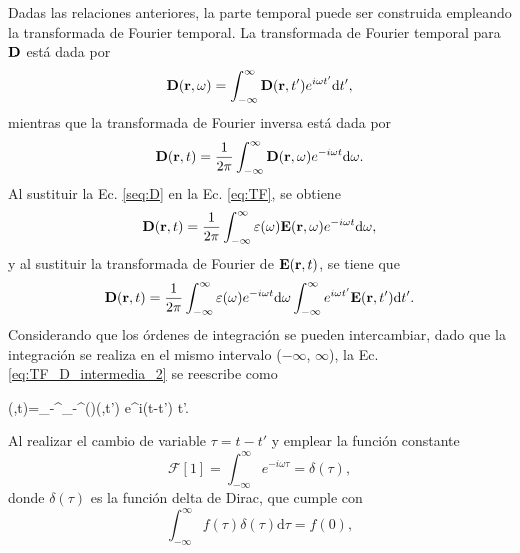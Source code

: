 Dadas las relaciones anteriores, la parte temporal puede ser construida empleando la transformada de Fourier temporal. La transformada de Fourier temporal para $\vb{D}$ está dada por~\cite{jacksonClassicalElectrodynamics2021a}
%
\begin{equation}
	\vb{D}(\vb{r},\omega)=\int_{-\infty}^{\infty}\vb{D}(\vb{r},t')e^{i\omega t'}\text{d}t',\label{eq:TFI}
\end{equation}
%
mientras que la transformada de Fourier inversa está dada por
%
\begin{equation}
	\vb{D}(\vb{r},t)=\frac{1}{2\pi}\int_{-\infty}^{\infty}\vb{D}(\vb{r},\omega)e^{-i\omega t}\text{d}\omega.\label{eq:TF}
\end{equation}
%
Al sustituir la Ec. \eqref{seq:D} en la Ec. \eqref{eq:TF}, se obtiene
%
\begin{equation}
	\vb{D}(\vb{r},t)=\frac{1}{2\pi}\int_{-\infty}^{\infty}\varepsilon(\omega)\vb{E}(\vb{r},\omega)e^{-i\omega t}\text{d}\omega,\label{eq:TF_D_intermedia_1}
\end{equation}
%
y al sustituir la transformada de Fourier de $\vb{E}(\vb{r},t)$, se tiene que
%
\begin{equation}
	\vb{D}(\vb{r},t)=\frac{1}{2\pi}\int_{-\infty}^{\infty}\varepsilon(\omega)e^{-i\omega t}\text{d}\omega\int_{-\infty}^{\infty}e^{i\omega t'}\vb{E}(\vb{r},t')\text{d}t'.\label{eq:TF_D_intermedia_2}
\end{equation}
%
Considerando que los órdenes de integración se pueden intercambiar, dado que la integración se realiza en el mismo intervalo ($-\infty$, $\infty$), la Ec. \eqref{eq:TF_D_intermedia_2} se reescribe como
%
\begin{tcolorbox}
	(,t)=\int_{-\infty}^{\infty}\int_{-\infty}^{\infty}\varepsilon(\omega)(,t') e^{i\omega (t-t')} \omega {}t'.\label{eq:TF_D_intermedia_3} 
\end{tcolorbox}
%
\noindent Al realizar el cambio de variable $\tau = t - t'$ y emplear la función constante \cite{arfkenMathematicalMethodsPhysicists2011a}
\begin{equation}
	\mathcal{F}[1]=\int_{-\infty}^{\infty}e^{-i\omega\tau}=\delta(\tau),
\end{equation}
donde $\delta(\tau)$ es la función delta de Dirac, que cumple con \cite{arfkenMathematicalMethodsPhysicists2011a}
\begin{equation}
	\int_{-\infty}^{\infty}f(\tau)\delta(\tau)\text{d}\tau=f(0),
\end{equation}

